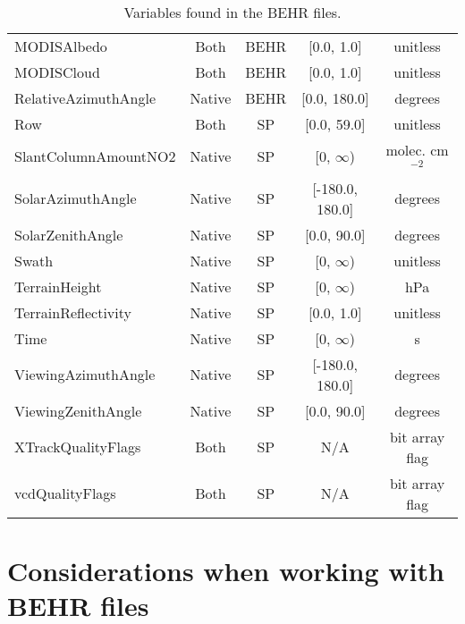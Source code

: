 \documentclass[12pt]{article}
\begin{document}
\begin{table}
\begin{center}
\begin{tabular}{lcccc}
	MODISAlbedo			&	Both		 	&	BEHR			&	[0.0, 1.0]	 & unitless \\
	MODISCloud			&	Both 		&	BEHR			&	[0.0, 1.0]	 & unitless \\
	RelativeAzimuthAngle &	Native	 	&	BEHR			&	[0.0, 180.0] & degrees \\
	Row					&	Both 		&	SP			&   [0.0, 59.0]	& unitless \\
	SlantColumnAmountNO2 & 	Native	 	&	SP			& 	[0, $\infty$) & molec. cm$^{-2}$ \\
	SolarAzimuthAngle	&	Native	 	&	SP			&	[-180.0, 180.0] & degrees \\
	SolarZenithAngle		&	Native	 	&	SP			&	[0.0, 90.0]		& degrees \\
	Swath				&	Native	 	&	SP			&	[0, $\infty$)	& unitless \\
	TerrainHeight		&	Native	 	& 	SP			&	[0, $\infty$) 	& hPa \\
	TerrainReflectivity	&	Native 		&	SP			&	[0.0, 1.0]		& unitless \\
	Time					&	Native	 	&	SP			&	[0, $\infty$)	& s \\
	ViewingAzimuthAngle	&	Native	 	&	SP			&	[-180.0, 180.0]	& degrees \\
	ViewingZenithAngle	&	Native	 	&	SP			&	[0.0, 90.0]		& degrees \\
	XTrackQualityFlags	&	Both 		&	SP			&	N/A				& bit array flag \\
	vcdQualityFlags		&	Both 		&	SP			&	N/A				& bit array flag \\
	\end{tabular}

	\end{center}
	\caption{Variables found in the BEHR files.}
	\label{tab:productvars}
	\end{table}

\FloatBarrier

\section{Considerations when working with BEHR files}
\end{document}
